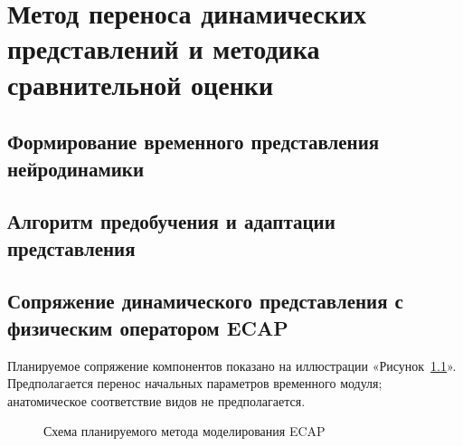 \chapter{Метод переноса динамических представлений и методика сравнительной оценки}

\section{Формирование временного представления нейродинамики}

\section{Алгоритм предобучения и адаптации представления}

\section{Сопряжение динамического представления с физическим оператором ECAP}
Планируемое сопряжение компонентов показано на иллюстрации «Рисунок~\ref{fig:planned-method}». Предполагается перенос начальных параметров временного модуля; анатомическое соответствие видов не предполагается.
\begin{figure}[htbp]
\centering

\caption{Схема планируемого метода моделирования ECAP}
\label{fig:planned-method}
\end{figure}
\FloatBarrier

